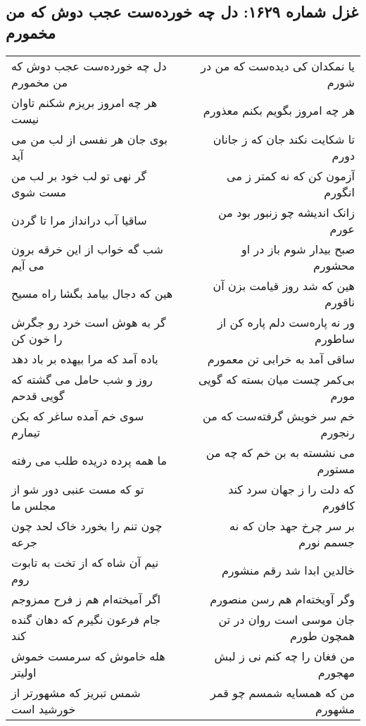 \begin{center}
\section*{غزل شماره ۱۶۲۹: دل چه خورده‌ست عجب دوش که من مخمورم}
\label{sec:1629}
\begin{longtable}{l p{0.5cm} r}
دل چه خورده‌ست عجب دوش که من مخمورم
&&
یا نمکدان کی دیده‌ست که من در شورم
\\
هر چه امروز بریزم شکنم تاوان نیست
&&
هر چه امروز بگویم بکنم معذورم
\\
بوی جان هر نفسی از لب من می آید
&&
تا شکایت نکند جان که ز جانان دورم
\\
گر نهی تو لب خود بر لب من مست شوی
&&
آزمون کن که نه کمتر ز می انگورم
\\
ساقیا آب درانداز مرا تا گردن
&&
زانک اندیشه چو زنبور بود من عورم
\\
شب گه خواب از این خرقه برون می آیم
&&
صبح بیدار شوم باز در او محشورم
\\
هین که دجال بیامد بگشا راه مسیح
&&
هین که شد روز قیامت بزن آن ناقورم
\\
گر به هوش است خرد رو جگرش را خون کن
&&
ور نه پاره‌ست دلم پاره کن از ساطورم
\\
باده آمد که مرا بیهده بر باد دهد
&&
ساقی آمد به خرابی تن معمورم
\\
روز و شب حامل می گشته که گویی قدحم
&&
بی‌کمر چست میان بسته که گویی مورم
\\
سوی خم آمده ساغر که بکن تیمارم
&&
خم سر خویش گرفته‌ست که من رنجورم
\\
ما همه پرده دریده طلب می رفته
&&
می نشسته به بن خم که چه من مستورم
\\
تو که مست عنبی دور شو از مجلس ما
&&
که دلت را ز جهان سرد کند کافورم
\\
چون تنم را بخورد خاک لحد چون جرعه
&&
بر سر چرخ جهد جان که نه جسمم نورم
\\
نیم آن شاه که از تخت به تابوت روم
&&
خالدین ابدا شد رقم منشورم
\\
اگر آمیخته‌ام هم ز فرح ممزوجم
&&
وگر آویخته‌ام هم رسن منصورم
\\
جام فرعون نگیرم که دهان گنده کند
&&
جان موسی است روان در تن همچون طورم
\\
هله خاموش که سرمست خموش اولیتر
&&
من فغان را چه کنم نی ز لبش مهجورم
\\
شمس تبریز که مشهورتر از خورشید است
&&
من که همسایه شمسم چو قمر مشهورم
\\
\end{longtable}
\end{center}
